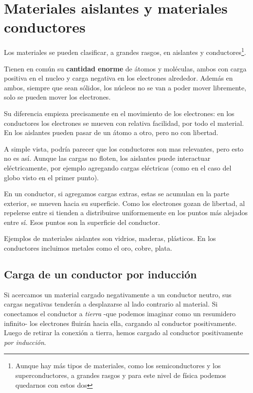 \section{Materiales aislantes y materiales conductores}

Los materiales se pueden clasificar,
a grandes rasgos,
en aislantes y conductores\footnote{Aunque hay más tipos de materiales, como los semiconductores y los superconductores, a grandes rasgos y para este nivel de física podemos quedarnos con estos dos}.

Tienen en común su \textbf{cantidad enorme} de átomos y moléculas,
ambos con carga positiva en el nucleo y carga negativa en los electrones alrededor.
Además en ambos,
siempre que sean sólidos,
los núcleos no se van a poder mover libremente,
solo se pueden mover los electrones.

Su diferencia empieza precisamente en el movimiento de los electrones:
en los conductores los electrones se mueven con relativa facilidad,
por todo el material.
En los aislantes pueden pasar de un átomo a otro,
pero no con libertad.

A simple vista,
podría parecer que los conductores son mas relevantes,
pero esto no es así.
Aunque las cargas no floten,
los aislantes puede interactuar eléctricamente,
por ejemplo agregando cargas eléctricas
(como en el caso del globo visto en el primer punto).

En un conductor,
si agregamos cargas extras,
estas se acumulan en la parte exterior,
se mueven hacia su superficie.
Como los electrones gozan de libertad,
al repelerse entre si tienden a distribuirse uniformemente 
en los puntos más alejados entre sí.
Esos puntos son la superficie del conductor.

Ejemplos de materiales aislantes son vidrios, maderas, plásticos.
En los conductores incluimos metales como el oro, cobre, plata.

\subsection{Carga de un conductor por inducción}

Si acercamos un material cargado negativamente a un conductor neutro,
sus cargas negativas tenderán a desplazarse al lado contrario al material.
Si conectamos el conductor a \textit{tierra}
-que podemos imaginar como un resumidero infinito-
los electrones fluirán hacia ella,
cargando al conductor positivamente.
Luego de retirar la conexión a tierra,
hemos cargado al conductor positivamente \textit{por inducción}.
